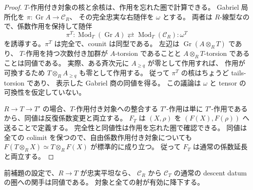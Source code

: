 \begin{proof}
$T$-作用付き対象の核と余核は、作用を忘れた圏で計算できる。
Gabriel 局所化を $\pi:\operatorname{Gr}A\to\mathcal C_R$、
その完全忠実な右随伴を $\omega$ とする。
両者は $R$-線型なので、係数作用を保持して随伴
\[
 \pi^T:\operatorname{Mod}_T(\operatorname{Gr}A)
 \rightleftarrows\operatorname{Mod}_T(\mathcal C_R):\omega^T
\]
を誘導する。$\pi^T$ は完全で、counit は同型である。
左辺は $\operatorname{Gr}(A\otimes_RT)$ であり、
$T$-作用を持つ次数付き加群が $A$-torsion であることと
$A\otimes_RT$-torsion であることは同値である。
実際、ある斉次元に $A_{\ge q}$ が零として作用すれば、
作用が可換するため $T\otimes_RA_{\ge q}$ も零として作用する。
従って $\pi^T$ の核はちょうど tails-torsion であり、
表示した Gabriel 商の同値を得る。
この議論は $\omega$ と tensor の可換性を仮定していない。

$R\to T\to T'$ の場合、$T$-作用付き対象への整合する
$T'$-作用は単に $T'$-作用であるから、同値は反復係数変更と両立する。
$F_T$ は $(X,\rho)$ を $(F(X),F(\rho))$ へ送ることで定義する。
完全性と同値性は作用を忘れた圏で確認できる。
同値は全ての colimit を保つので、自由係数作用付き対象についても
$F(T\otimes_RX)\simeq T\otimes_RF(X)$ が標準的に成り立つ。
従って $F_T$ は通常の係数延長と両立する。
\end{proof}

\begin{lemma}
\label{lem:nfm-tails-fpqc}
前補題の設定で、$R\to T$ が忠実平坦なら、
$\mathcal C_R$ から $\mathcal C_T$ の通常の descent datum の圏への関手は同値である。
対象と全ての射が有効に降下する。
\end{lemma}

